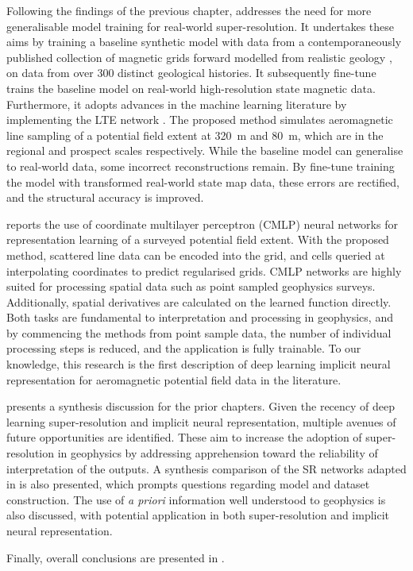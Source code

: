 Following the findings of the previous chapter,  addresses the need for more generalisable model training for real-world super-resolution.
It undertakes these aims by training a baseline synthetic model with data from a contemporaneously published collection of magnetic grids forward modelled from realistic geology \parencite{jessellNoddyverseMassiveData2022}, on data from over \num{300} distinct geological histories.
It subsequently fine-tune trains the baseline model on real-world high-resolution state magnetic data.
Furthermore, it adopts advances in the machine learning literature by implementing the LTE network \parencite{leeLocalTextureEstimator2022}.
The proposed method simulates aeromagnetic line sampling of a potential field extent at \qty{320}{\m} and \qty{80}{\m}, which are in the regional and prospect scales respectively.
While the baseline model can generalise to real-world data, some incorrect reconstructions remain.
By fine-tune training the model with transformed real-world state map data, these errors are rectified, and the structural accuracy is improved.

 reports the use of coordinate multilayer perceptron (CMLP) neural networks for representation learning of a surveyed potential field extent.
With the proposed method, scattered line data can be encoded into the grid, and cells queried at interpolating coordinates to predict regularised grids.
CMLP networks are highly suited for processing spatial data such as point sampled geophysics surveys.
Additionally, spatial derivatives are calculated on the learned function directly.
Both tasks are fundamental to interpretation and processing in geophysics, and by commencing the methods from point sample data, the number of individual processing steps is reduced, and the application is fully trainable.
To our knowledge, this research is the first description of deep learning implicit neural representation for aeromagnetic potential field data in the literature.

 presents a synthesis discussion for the prior chapters. Given the recency of deep learning super-resolution and implicit neural representation, multiple avenues of future opportunities are identified.
These aim to increase the adoption of super-resolution in geophysics by addressing apprehension toward the reliability of interpretation of the outputs.
A synthesis comparison of the SR networks adapted in  is also presented, which prompts questions regarding model and dataset construction.
The use of \emph{a priori} information well understood to geophysics is also discussed, with potential application in both super-resolution and implicit neural representation.

Finally, overall conclusions are presented in .

\printbibliography{}

% 